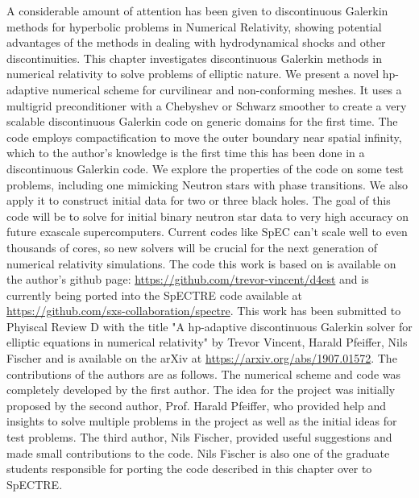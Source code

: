 A considerable amount of attention has been given to discontinuous
Galerkin methods for hyperbolic problems in Numerical Relativity,
showing potential advantages of the methods in dealing with
hydrodynamical shocks and other discontinuities.
This chapter investigates discontinuous Galerkin
methods in numerical relativity to solve problems of elliptic
nature.  We present a novel hp-adaptive numerical
scheme for curvilinear and non-conforming meshes.  It uses a multigrid
preconditioner with a Chebyshev or Schwarz smoother to create a very scalable discontinuous Galerkin code
on generic domains for the first time.  The code employs compactification
  to move the outer boundary near spatial infinity, which to the author's knowledge is the first time this has been done in a discontinuous Galerkin code. 
We explore the properties of the code on some test
problems, including one mimicking Neutron stars with phase transitions.
  We also apply it to construct initial data for two or three black holes. The goal of this code will be to solve for initial binary neutron star data to very high accuracy on future exascale supercomputers. Current codes like SpEC can't scale well to even thousands of cores, so new solvers will be crucial for the next generation of numerical relativity simulations. The code this work is based on is available on the author's github page: \url{https://github.com/trevor-vincent/d4est} and is currently being ported into the SpECTRE code available at \url{https://github.com/sxs-collaboration/spectre}. This work has been submitted to Phyiscal Review D with the title "A hp-adaptive discontinuous Galerkin solver for elliptic equations in numerical relativity" by Trevor Vincent, Harald Pfeiffer, Nils Fischer and is available on the arXiv at \url{https://arxiv.org/abs/1907.01572}. The contributions of the authors are as follows. The numerical scheme and code was completely developed by the first author. The idea for the project was initially proposed by the second author, Prof. Harald Pfeiffer, who provided help and insights to solve multiple problems in the project as well as the initial ideas for test problems. The third author, Nils Fischer, provided useful suggestions and made small contributions to the code. Nils Fischer is also one of the graduate students responsible for porting the code described in this chapter over to SpECTRE. 

